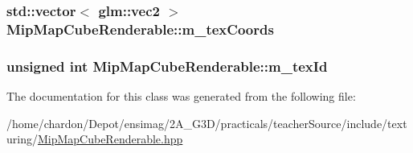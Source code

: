 \hypertarget{classMipMapCubeRenderable_a8c1d0d581985087fffa7328474e8167c}{
\subsubsection[{m\+\_\+tex\+Coords}]{\setlength{\rightskip}{0pt plus 5cm}std\+::vector$<$ glm\+::vec2 $>$ Mip\+Map\+Cube\+Renderable\+::m\+\_\+tex\+Coords\hspace{0.3cm}{\ttfamily [private]}}}\label{classMipMapCubeRenderable_a8c1d0d581985087fffa7328474e8167c}
\hypertarget{classMipMapCubeRenderable_af1dd441331717c8edffc73b18edb17e1}{
\subsubsection[{m\+\_\+tex\+Id}]{\setlength{\rightskip}{0pt plus 5cm}unsigned int Mip\+Map\+Cube\+Renderable\+::m\+\_\+tex\+Id\hspace{0.3cm}{\ttfamily [private]}}}\label{classMipMapCubeRenderable_af1dd441331717c8edffc73b18edb17e1}


The documentation for this class was generated from the following file\+:\begin{DoxyCompactItemize}
\item 
/home/chardon/\+Depot/ensimag/2\+A\+\_\+\+G3\+D/practicals/teacher\+Source/include/texturing/\hyperlink{MipMapCubeRenderable_8hpp}{Mip\+Map\+Cube\+Renderable.\+hpp}\end{DoxyCompactItemize}
